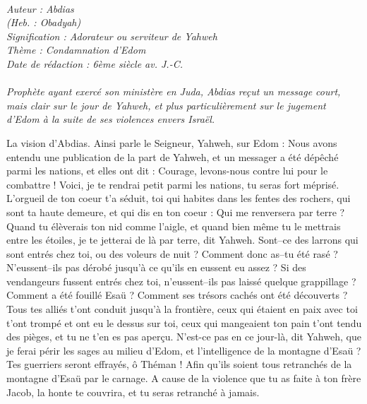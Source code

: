 \BFont
\noindent\hrulefill
{\footnotesize
\textit{
\bigskip
{\centering{}
\\Auteur : Abdias
\\(Heb. : Obadyah)
\\Signification : Adorateur ou serviteur de Yahweh
\\Thème : Condamnation d'Edom
\\Date de rédaction : 6ème siècle av. J.-C.\\}
}
\textit{
\\Prophète ayant exercé son ministère en Juda, Abdias reçut un message court, mais clair sur le jour de Yahweh, et plus particulièrement sur le jugement d’Edom à la suite de ses violences envers Israël.\bigskip
}
}
\par\nobreak\noindent\hrulefill
\begin{multicols}{2}
\VerseOne{}La vision d'Abdias. Ainsi parle le Seigneur, Yahweh, sur Edom : Nous avons entendu une publication de la part de Yahweh, et un messager a été dépêché parmi les nations, et elles ont dit : Courage, levons-nous contre lui pour le combattre !
Voici, je te rendrai petit parmi les nations, tu seras fort méprisé.
L'orgueil de ton coeur t'a séduit, toi qui habites dans les fentes des rochers, qui sont ta haute demeure, et qui dis en ton coeur : Qui me renversera par terre ?
Quand tu élèverais ton nid comme l'aigle, et quand bien même tu le mettrais entre les étoiles, je te jetterai de là par terre, dit Yahweh.
Sont–ce des larrons qui sont entrés chez toi, ou des voleurs de nuit ? Comment donc as–tu été rasé ? N'eussent–ils pas dérobé jusqu'à ce qu'ils en eussent eu assez ? Si des vendangeurs fussent entrés chez toi, n'eussent–ils pas laissé quelque grappillage ?
Comment a été fouillé Esaü ? Comment ses trésors cachés ont été découverts ?
Tous tes alliés t'ont conduit jusqu'à la frontière, ceux qui étaient en paix avec toi t'ont trompé et ont eu le dessus sur toi, ceux qui mangeaient ton pain t'ont tendu des pièges, et tu ne t’en es pas aperçu.
N’est-ce pas en ce jour-là, dit Yahweh, que je ferai périr les sages au milieu d'Edom, et l’intelligence de la montagne d'Esaü ?
Tes guerriers seront effrayés, ô Théman ! Afin qu’ils soient tous retranchés de la montagne d'Esaü par le carnage.
A cause de la violence que tu as faite à ton frère Jacob, la honte te couvrira, et tu seras retranché à jamais.

\end{multicols}
